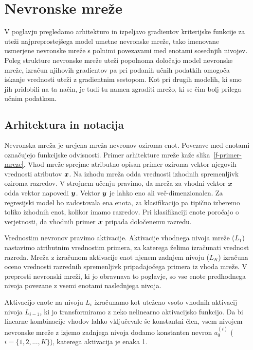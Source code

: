 \chapter{Nevronske mreže}


V poglavju pregledamo arhitekturo in izpeljavo gradientov kriterijske funkcije za uteži najpreprostejšega model umetne nevronske mreže, tako imenovane usmerjene  nevronske mreže s polnimi povezavami med enotami sosednjih nivojev. Poleg strukture nevronske mreže uteži popolnoma določajo model nevronske mreže, izračun njihovih gradientov pa pri podanih učnih podatkih omogoča iskanje vrednosti uteži z gradientnim sestopom. Kot pri drugih modelih, ki smo jih pridobili na ta način, je tudi tu namen zgraditi mrežo, ki se čim bolj prilega učnim podatkom.

\section{Arhitektura in notacija}

Nevronska mreža je urejena mreža nevronov oziroma enot. Povezave med enotami označujejo funkcijske odvisnosti. Primer arhitekture mreže kaže slika~\ref{f-primer-mreze}. Vhod mreže sprejme atributno opisan primer oziroma vektor njegovih vrednosti atributov $\boldsymbol{x}$. Na izhodu mreža odda vrednosti izhodnih spremenljivk oziroma razredov. V strojnem učenju pravimo, da mreža za vhodni vektor $\boldsymbol{x}$ odda vektor napovedi $\boldsymbol{y}$. Vektor $\boldsymbol{y}$ je lahko eno ali več-dimenzionalen. Za regresijski model bo zadostovala ena enota, za klasifikacijo pa tipično izberemo toliko izhodnih enot, kolikor imamo razredov. Pri klasifikaciji enote poročajo o verjetnosti, da vhodnih primer $\boldsymbol{x}$ pripada določenemu razredu.

Vrednostim nevronov pravimo aktivacije. Aktivacije vhodnega nivoja mreže ($L_1$) nastavimo atributnim vrednostim primera, za katerega želimo izračunati vrednost razreda. Mreža z izračunom aktivacije enot njenem zadnjem nivoju ($L_K$) izračuna oceno vrednosti razrednih spremenljivk pripadajočega primera iz vhoda mreže. V preprosti nevronski mreži, ki jo obravnava to poglavje, so vse enote predhodnega nivoja povezane z vsemi enotami naslednjega nivoja. 

Aktivacijo enote na nivoju $L_i$ izračunamo kot uteženo vsoto vhodnih aktivacij nivoja $L_{i-1}$, ki jo transformiramo z neko nelinearno aktivacijsko funkcijo. Da bi linearne kombinacije vhodov lahko vključevale še konstantni člen, vsem nivojem nevronske mreže z izjemo zadnjega nivoja dodamo konstanten nevron $a_0^{(i)}$ ($i=\{1,2,\ldots,K\}$), katerega aktivacija je enaka 1.

